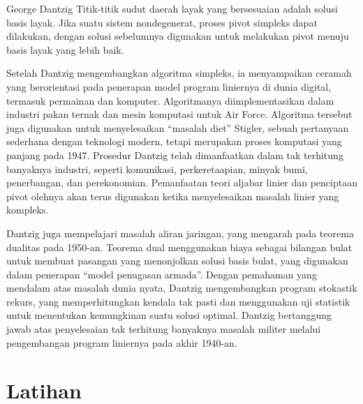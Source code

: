 \begin{pioneerspotlight}{George Dantzig}
Titik-titik sudut daerah layak yang bersesuaian adalah solusi basis layak. Jika suatu sistem nondegenerat, proses pivot simpleks dapat dilakukan, dengan solusi sebelumnya digunakan untuk melakukan pivot menuju basis layak yang lebih baik.

Setelah Dantzig mengembangkan algoritma simpleks, ia menyampaikan ceramah yang berorientasi pada penerapan model program liniernya di dunia digital, termasuk permainan dan komputer. Algoritmanya diimplementasikan dalam industri pakan ternak dan mesin komputasi untuk Air Force. Algoritma tersebut juga digunakan untuk menyelesaikan ``masalah diet'' Stigler, sebuah pertanyaan sederhana dengan teknologi modern, tetapi merupakan proses komputasi yang panjang pada 1947. Prosedur Dantzig telah dimanfaatkan dalam tak terhitung banyaknya industri, seperti komunikasi, perkeretaapian, minyak bumi, penerbangan, dan perekonomian. Pemanfaatan teori aljabar linier dan penciptaan pivot olehnya akan terus digunakan ketika menyelesaikan masalah linier yang kompleks.

Dantzig juga mempelajari masalah aliran jaringan, yang mengarah pada teorema dualitas pada 1950-an. Teorema dual menggunakan biaya sebagai bilangan bulat untuk membuat pasangan yang menonjolkan solusi basis bulat, yang digunakan dalam penerapan ``model penugasan armada''. Dengan pemahaman yang mendalam atas masalah dunia nyata, Dantzig mengembangkan program stokastik rekurs, yang memperhitungkan kendala tak pasti dan menggunakan uji statistik untuk menentukan kemungkinan suatu solusi optimal. Dantzig bertanggung jawab atas penyelesaian tak terhitung banyaknya masalah militer melalui pengembangan program liniernya pada akhir 1940-an.

\end{pioneerspotlight}
\section{Latihan}


